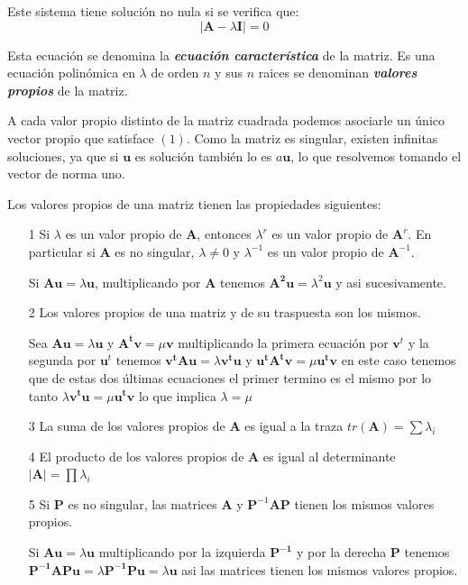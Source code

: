 \documentclass[12pt,letterpaper]{report} %
\begin{document}
Este sistema tiene solución no nula si se verifica que:
$$|\mathbf{A}- \lambda\mathbf{I}|=0$$

Esta ecuación se denomina la \textit{\textbf{ecuación característica}} de la matriz. Es una ecuación polinómica en $\lambda$ de orden $n$ y sus $n$ raices se denominan \textit{\textbf{valores propios}} de la matriz.

A cada valor propio distinto de la matriz cuadrada podemos asociarle un único vector propio que satisface $(1)$. Como la matriz es singular, existen infinitas soluciones, ya que si $\mathbf{u}$ es solución también lo es $a\mathbf{u}$, lo que resolvemos tomando el vector de norma uno.

Los valores propios de una matriz tienen las propiedades siguientes:
\begin{itemize}
\item[1] Si $\lambda$ es un valor propio de $\mathbf{A}$, entonces $\lambda^r$ es un valor propio de $\mathbf{A}^r$. En particular si $\mathbf{A}$ es no singular, $\lambda \ne 0$ y $\lambda^{-1}$ es un valor propio de $\mathbf{A}^{-1}$.

Si $\mathbf{Au}=\lambda\mathbf{u}$, multiplicando por $\mathbf{A}$ tenemos $\mathbf{A^2u}=\lambda^2\mathbf{u}$ y asi sucesivamente.

\item[2] Los valores propios de una matriz y de su traspuesta son los mismos.

Sea $\mathbf{Au}=\lambda \mathbf{u}$ y $\mathbf{A^t v}=\mu \mathbf{v}$ multiplicando la primera ecuación por $\mathbf{v}^t$ y la segunda por $\mathbf{u}^t$ tenemos $\mathbf{v^t A u}=\lambda \mathbf{v^tu}$ y $\mathbf{u^t A^t v}=\mu \mathbf{u^t v}$ en este caso tenemos que de estas dos últimas ecuaciones el primer termino es el mismo por lo tanto $\lambda \mathbf{v^tu}=\mu \mathbf{u^t v}$ lo que implica $\lambda=\mu$

\item[3] La suma de los valores propios de $\mathbf{A}$ es igual a la traza $tr(\mathbf{A})=\sum \lambda_{i}$

\item[4] El producto de los valores propios de $\mathbf{A}$ es igual al determinante $|\mathbf{A}|=\prod \lambda_{i}$

\item[5] Si $\mathbf{P}$ es no singular, las matrices $\mathbf{A}$ y $\mathbf{P}^{-1}\mathbf{A}\mathbf{P}$ tienen los mismos valores propios.

Si $\mathbf{Au}=\lambda \mathbf{u}$ multiplicando por la izquierda $\mathbf{P^{-1}}$ y por la derecha $\mathbf{P}$ tenemos $\mathbf{P^{-1}APu}=\lambda \mathbf{P^{-1}Pu}=\lambda \mathbf{u}$ asi las matrices tienen los mismos valores propios.


\end{itemize}
\end{document}
